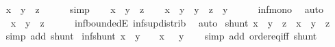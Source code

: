 \begin{isabellebody}
\ \ \isamarkupfalse%
\ {\isachardoublequoteopen}x\ {\isasymle}\ {\isacharminus}{\kern0pt}y\ {\isasymsqunion}\ z{\isachardoublequoteclose}\isanewline
\ \ \ \ \isamarkupfalse%
\ simp\isanewline
{}\isamarkupfalse%
\isanewline
\ \ \isamarkupfalse%
\ {\isachardoublequoteopen}x\ {\isasymle}\ {\isacharminus}{\kern0pt}y\ {\isasymsqunion}\ z{\isachardoublequoteclose}\isanewline
\ \ \isamarkupfalse%
\ {\isachardoublequoteopen}x\ {\isasymsqinter}\ y\ {\isasymle}\ {\isacharparenleft}{\kern0pt}{\isacharminus}{\kern0pt}y\ {\isasymsqunion}\ z{\isacharparenright}{\kern0pt}\ {\isasymsqinter}\ y{\isachardoublequoteclose}\isanewline
\ \ \ \ \isamarkupfalse%
\ inf{\isacharunderscore}{\kern0pt}mono\ \isamarkupfalse%
\ auto\isanewline
\ \ \isamarkupfalse%
\ \ {\isachardoublequoteopen}x\ {\isasymsqinter}\ y\ {\isasymle}\ z{\isachardoublequoteclose}\isanewline
\ \ \ \ \isamarkupfalse%
\ inf{\isachardot}{\kern0pt}boundedE\ inf{\isacharunderscore}{\kern0pt}sup{\isacharunderscore}{\kern0pt}distrib{}\ \isamarkupfalse%
\ auto\isanewline
{}\isamarkupfalse%
%
\endisatagproof
{\isafoldproof}%
%
\isadelimproof
\isanewline
%
\endisadelimproof
\isanewline
{}\isamarkupfalse%
\ shunt{}{\isacharcolon}{\kern0pt}\ {\isachardoublequoteopen}{\isacharparenleft}{\kern0pt}x\ {\isasymsqinter}\ {\isacharminus}{\kern0pt}y\ {\isasymle}\ z{\isacharparenright}{\kern0pt}\ {\isasymlongleftrightarrow}\ {\isacharparenleft}{\kern0pt}x\ {\isasymle}\ y\ {\isasymsqunion}\ z{\isacharparenright}{\kern0pt}{\isachardoublequoteclose}\isanewline
%
\isadelimproof
\ \ %
\endisadelimproof
%
\isatagproof
{}\isamarkupfalse%
\ {\isacharparenleft}{\kern0pt}simp\ add{\isacharcolon}{\kern0pt}\ shunt{}{\isacharparenright}{\kern0pt}%
\endisatagproof
{\isafoldproof}%
%
\isadelimproof
\isanewline
%
\endisadelimproof
\isanewline
{}\isamarkupfalse%
\ inf{\isacharunderscore}{\kern0pt}shunt{\isacharcolon}{\kern0pt}\ {\isachardoublequoteopen}{\isacharparenleft}{\kern0pt}x\ {\isasymsqinter}\ y\ {\isacharequal}{\kern0pt}\ {\isasymbottom}{\isacharparenright}{\kern0pt}\ {\isasymlongleftrightarrow}\ {\isacharparenleft}{\kern0pt}x\ {\isasymle}\ {\isacharminus}{\kern0pt}\ y{\isacharparenright}{\kern0pt}{\isachardoublequoteclose}\isanewline
%
\isadelimproof
\ \ %
\endisadelimproof
%
\isatagproof
{}\isamarkupfalse%
\ {\isacharparenleft}{\kern0pt}simp\ add{\isacharcolon}{\kern0pt}\ order{\isachardot}{\kern0pt}eq{\isacharunderscore}{\kern0pt}iff\ shunt{}{\isacharparenright}{\kern0pt}%

\end{isabellebody}
